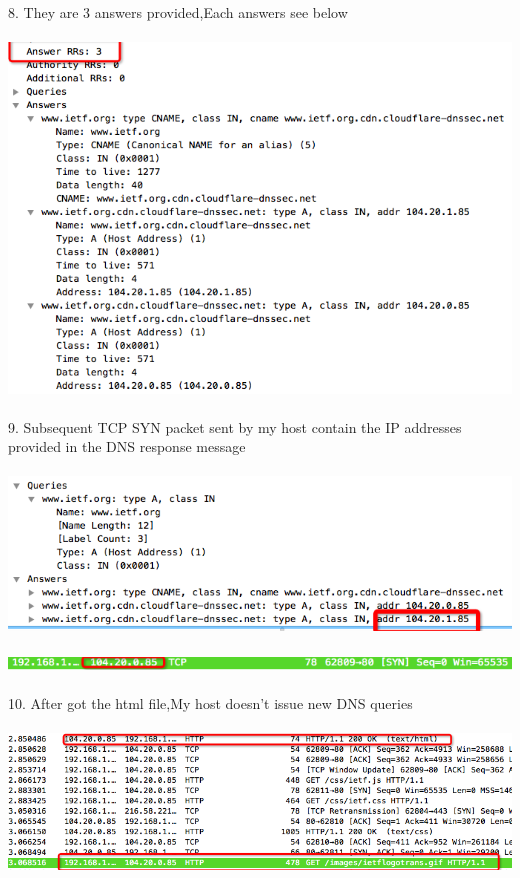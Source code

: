 \documentclass[a4paper]{article}
\begin{document}
{	8. They are 3 answers provided,Each answers see below\\\\
	{\centering\includegraphics[scale=0.5]{Illustrations/8.png}}\\\\
	9. Subsequent TCP SYN packet sent by my host contain the IP addresses provided in the DNS response message\\\\
	{\centering\includegraphics[scale=0.5]{Illustrations/9_1.png}}\\\\
	{\centering\includegraphics[scale=0.5]{Illustrations/9_2.png}}\\\\
	10. After got the html file,My host doesn't issue new DNS queries\\\\
	{\centering\includegraphics[scale=0.5]{Illustrations/10.png}}\\\\
}
\end{document}
